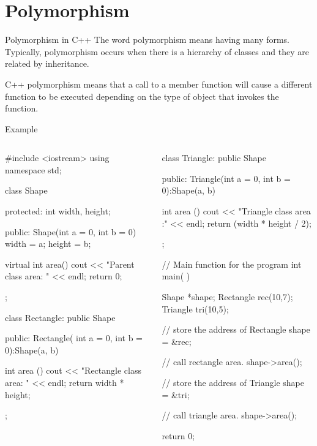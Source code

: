 \documentclass[../lecture5-objectorientation.tex]{subfiles}
\begin{document}
\section{Polymorphism}


\begin{frame}[fragile]{Polymorphism in C++}
    The word polymorphism means having many forms. Typically, polymorphism occurs when there is a hierarchy of classes and they are related by inheritance. \newline

    C++ polymorphism means that a call to a member function will cause a different function to be executed depending on the type of object that invokes the function.
\end{frame}

\begin{frame}[fragile]{Example}
    \begin{columns}[T,onlytextwidth]
            \begin{cppcode}[lastline=34]
#include <iostream>
using namespace std;

class Shape
{
    protected:
        int width, height;

    public:
        Shape(int a = 0, int b = 0)
        {
            width = a;
            height = b;
        }

        virtual int area()
        {
            cout << "Parent class area: " << endl;
            return 0;
        }
};

class Rectangle: public Shape
{
    public:
        Rectangle( int a = 0, int b = 0):Shape(a, b)
        { }

        int area ()
        {
            cout << "Rectangle class area: " << endl;
            return width * height;
        }
};
            \end{cppcode}
            \begin{cppcode}[lastline=34]
class Triangle: public Shape
{
    public:
        Triangle(int a = 0, int b = 0):Shape(a, b)
        { }

        int area ()
        {
            cout << "Triangle class area :" << endl;
            return (width * height / 2);
        }
};

// Main function for the program
int main( )
{
    Shape *shape;
    Rectangle rec(10,7);
    Triangle  tri(10,5);

    // store the address of Rectangle
    shape = &rec;

    // call rectangle area.
    shape->area();

    // store the address of Triangle
    shape = &tri;

    // call triangle area.
    shape->area();

    return 0;
}
            \end{cppcode}
    \end{columns}
\end{frame}
\end{document}
